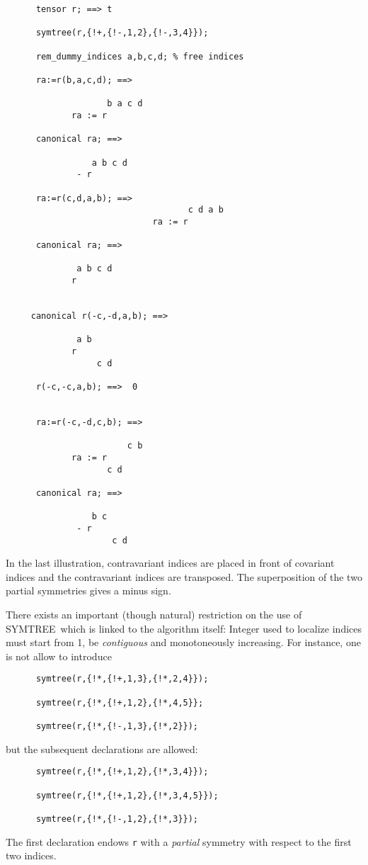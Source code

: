 \begin{verbatim}
      tensor r; ==> t

      symtree(r,{!+,{!-,1,2},{!-,3,4}});

      rem_dummy_indices a,b,c,d; % free indices
   
      ra:=r(b,a,c,d); ==>

                    b a c d
             ra := r

      canonical ra; ==>

                 a b c d
              - r

      ra:=r(c,d,a,b); ==>
                                    c d a b
                             ra := r

      canonical ra; ==>

              a b c d
             r


     canonical r(-c,-d,a,b); ==>

              a b
             r
                  c d

      r(-c,-c,a,b); ==>  0


      ra:=r(-c,-d,c,b); ==>

                        c b
             ra := r
                    c d

      canonical ra; ==>

                 b c
              - r
                     c d
\end{verbatim}
In the last illustration, contravariant indices are placed in front 
of covariant indices and the contravariant indices are transposed. 
The superposition of the two partial symmetries gives a minus sign.

There exists an important (though natural) restriction on the use of 
SYMTREE\ which is linked to the algorithm itself: Integer used to localize
indices must start from 1, be \emph{contiguous} and monotoneously increasing. 
For instance, one is not allow to introduce
\begin{verbatim}
      symtree(r,{!*,{!+,1,3},{!*,2,4}});

      symtree(r,{!*,{!+,1,2},{!*,4,5}};

      symtree(r,{!*,{!-,1,3},{!*,2}});
\end{verbatim}
but the subsequent declarations are allowed:
\begin{verbatim}
      symtree(r,{!*,{!+,1,2},{!*,3,4}});

      symtree(r,{!*,{!+,1,2},{!*,3,4,5}});

      symtree(r,{!*,{!-,1,2},{!*,3}});
\end{verbatim}
The first declaration endows \texttt{r} with a \emph{partial} symmetry 
with respect to the first two indices. 

